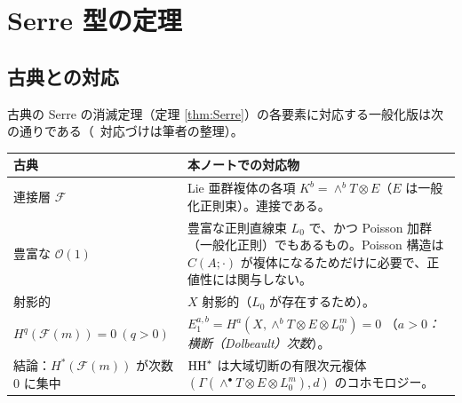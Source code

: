 \section{Serre 型の定理}\label{sec:serre}
\subsection{古典との対応}
古典の Serre の消滅定理（定理 \ref{thm:Serre}）の各要素に対応する一般化版は次の通りである（\tK\ 対応づけは筆者の整理）。
\begin{center}\small
\begin{tabular}{p{4.6cm}p{9.8cm}}\toprule
古典 & 本ノートでの対応物\\\midrule
連接層 $\mathcal F$ & Lie 亜群複体の各項 $K^b=\wedge^bT\otimes E$（$E$ は一般化正則束）。連接である。\\
豊富な $\mathcal O(1)$ & 豊富な正則直線束 $L_0$ で、かつ Poisson 加群（一般化正則）でもあるもの。Poisson 構造は $C(A;\cdot)$ が複体になるためだけに必要で、正値性には関与しない。\\
射影的 & $X$ 射影的（$L_0$ が存在するため）。\\
$H^q(\mathcal F(m))=0\ (q>0)$ & $E_1^{a,b}=H^a(X,\wedge^bT\otimes E\otimes L_0^m)=0$ （\emph{$a>0$：横断（Dolbeault）次数}）。\\
結論：$H^*(\mathcal F(m))$ が次数 0 に集中 & $\mathrm{HH}^*$ は大域切断の有限次元複体 $(\Gamma(\wedge^\bullet T\otimes E\otimes L_0^m),d)$ のコホモロジー。\\\bottomrule
\end{tabular}
\end{center}

